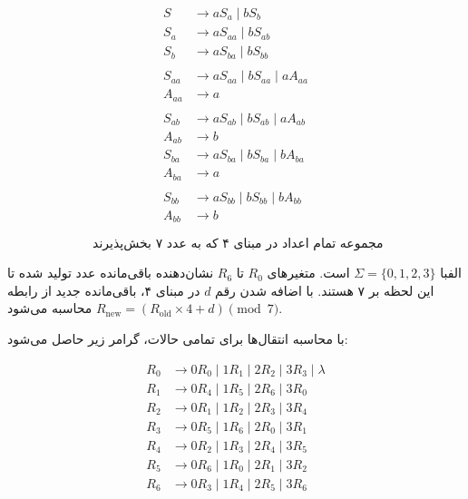 \[
\begin{aligned}
    S &\rightarrow aS_{a} \mid bS_{b} \\
    S_{a} &\rightarrow aS_{aa} \mid bS_{ab} \\
    S_{b} &\rightarrow aS_{ba} \mid bS_{bb} \\
    \\
    S_{aa} &\rightarrow aS_{aa} \mid bS_{aa} \mid aA_{aa} \\
    A_{aa} &\rightarrow a \\
    \\
    S_{ab} &\rightarrow aS_{ab} \mid bS_{ab} \mid aA_{ab} \\
    A_{ab} &\rightarrow b \\
    S_{ba} &\rightarrow aS_{ba} \mid bS_{ba} \mid bA_{ba} \\
    A_{ba} &\rightarrow a \\
    \\
    S_{bb} &\rightarrow aS_{bb} \mid bS_{bb} \mid bA_{bb} \\
    A_{bb} &\rightarrow b
\end{aligned}
\]

\[
\text{ مجموعه تمام اعداد در مبنای ۴ که به عدد ۷ بخش‌پذیرند}
\]

الفبا $\Sigma = \{0, 1, 2, 3\}$ است. متغیرهای $R_0$ تا $R_6$ نشان‌دهنده باقی‌مانده عدد تولید شده تا این لحظه بر ۷ هستند. با اضافه شدن رقم $d$ در مبنای ۴، باقی‌مانده جدید از رابطه $R_{\text{new}} = (R_{\text{old}} \times 4 + d) \pmod 7$ محاسبه می‌شود.

با محاسبه انتقال‌ها برای تمامی حالات، گرامر زیر حاصل می‌شود:

\[
\begin{aligned}
    R_0 &\rightarrow 0R_0 \mid 1R_1 \mid 2R_2 \mid 3R_3 \mid \lambda \\
    R_1 &\rightarrow 0R_4 \mid 1R_5 \mid 2R_6 \mid 3R_0 \\
    R_2 &\rightarrow 0R_1 \mid 1R_2 \mid 2R_3 \mid 3R_4 \\
    R_3 &\rightarrow 0R_5 \mid 1R_6 \mid 2R_0 \mid 3R_1 \\
    R_4 &\rightarrow 0R_2 \mid 1R_3 \mid 2R_4 \mid 3R_5 \\
    R_5 &\rightarrow 0R_6 \mid 1R_0 \mid 2R_1 \mid 3R_2 \\
    R_6 &\rightarrow 0R_3 \mid 1R_4 \mid 2R_5 \mid 3R_6
\end{aligned}
\]
